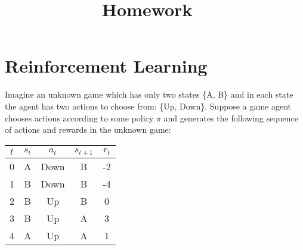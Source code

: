 \documentclass[11pt, answers]{exam}
\title{Homework \hmwkNumber\ \hmwkType}
\date{\hmwkDue}
\begin{document}
\maketitle

\section{Reinforcement Learning}

Imagine an unknown game which has only two states \{A, B\} and in each state the agent has two actions to choose from: \{Up, Down\}. Suppose a game agent chooses actions according to some policy $\pi$ and generates the following sequence of actions and rewards in the unknown game:

\begin{table}[h!]
\centering
\begin{tabular}{|c|c|c|c|c|}
\hline
$t$ & $s_t$ & $a_t$   & $s_{t+1}$ & $r_t$ \\ \hline
0 & A  & Down & B    & -2 \\ \hline
1 & B  & Down & B    & -4 \\ \hline
2 & B  & Up   & B    & 0  \\ \hline
3 & B  & Up   & A    & 3  \\ \hline
4 & A  & Up   & A    & 1  \\ \hline
\end{tabular}
\end{table}
\end{document}
